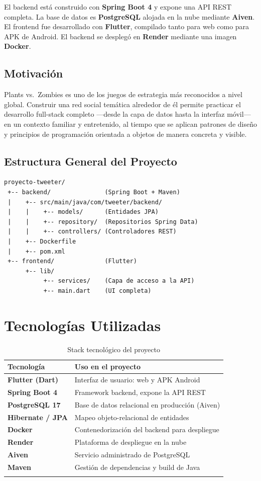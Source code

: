 \documentclass[12pt,a4paper]{article}
\begin{document}
El backend está construido con \textbf{Spring Boot 4} y expone una API REST completa. La base de datos es \textbf{PostgreSQL} alojada en la nube mediante \textbf{Aiven}. El frontend fue desarrollado con \textbf{Flutter}, compilado tanto para web como para APK de Android. El backend se desplegó en \textbf{Render} mediante una imagen \textbf{Docker}.

\subsection{Motivación}

Plants vs.\ Zombies es uno de los juegos de estrategia más reconocidos a nivel global. Construir una red social temática alrededor de él permite practicar el desarrollo full-stack completo —desde la capa de datos hasta la interfaz móvil— en un contexto familiar y entretenido, al tiempo que se aplican patrones de diseño y principios de programación orientada a objetos de manera concreta y visible.

\subsection{Estructura General del Proyecto}

\begin{verbatim}
proyecto-tweeter/
 +-- backend/               (Spring Boot + Maven)
 |    +-- src/main/java/com/tweeter/backend/
 |    |    +-- models/      (Entidades JPA)
 |    |    +-- repository/  (Repositorios Spring Data)
 |    |    +-- controllers/ (Controladores REST)
 |    +-- Dockerfile
 |    +-- pom.xml
 +-- frontend/              (Flutter)
      +-- lib/
           +-- services/    (Capa de acceso a la API)
           +-- main.dart    (UI completa)
\end{verbatim}


\section{Tecnologías Utilizadas}

\begin{longtable}{>{\bfseries}p{4cm} p{9.5cm}}
\toprule
Tecnología & Uso en el proyecto \\
\midrule
\endhead
Flutter (Dart) & Interfaz de usuario: web y APK Android \\
Spring Boot 4 & Framework backend, expone la API REST \\
PostgreSQL 17 & Base de datos relacional en producción (Aiven) \\
Hibernate / JPA & Mapeo objeto-relacional de entidades \\
Docker & Contenedorización del backend para despliegue \\
Render & Plataforma de despliegue en la nube \\
Aiven & Servicio administrado de PostgreSQL \\
Maven & Gestión de dependencias y build de Java \\
\bottomrule
\caption{Stack tecnológico del proyecto}
\end{longtable}
\end{document}
